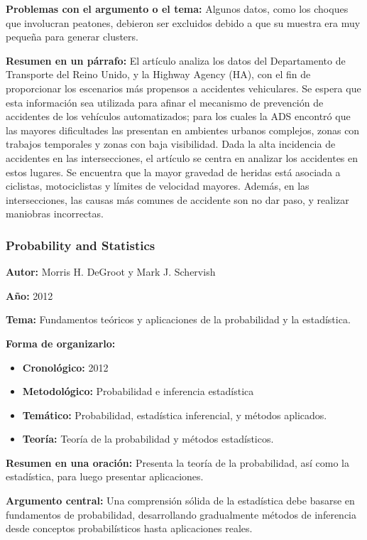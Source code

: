 \documentclass{book}
\begin{document}
\textbf{Problemas con el argumento o el tema:} Algunos datos, como los choques que involucran peatones, debieron ser excluidos debido a que su muestra era muy pequeña para generar clusters.

\textbf{Resumen en un párrafo:} El artículo analiza los datos del Departamento de Transporte del Reino Unido, y la Highway Agency (HA), con el fin de proporcionar los escenarios más propensos a accidentes vehiculares. Se espera que esta información sea utilizada para afinar el mecanismo de prevención de accidentes de los vehículos automatizados; para los cuales la ADS encontró que las mayores dificultades las presentan en ambientes urbanos complejos, zonas con trabajos temporales y zonas con baja visibilidad. Dada la alta incidencia de accidentes en las intersecciones, el artículo se centra en analizar los accidentes en estos lugares.  Se encuentra que la mayor gravedad de heridas está asociada a ciclistas, motociclistas y límites de velocidad mayores. Además, en las intersecciones, las causas más comunes de accidente son no dar paso, y realizar maniobras incorrectas. 

\subsubsection{Probability and Statistics}
\textbf{Autor:} Morris H. DeGroot y Mark J. Schervish

\textbf{Año:} 2012

\textbf{Tema:} Fundamentos teóricos y aplicaciones de la probabilidad y la estadística.


\textbf{Forma de organizarlo:}

\begin{itemize}
\setlength{\itemindent}{0.5in}
    \item \textbf{Cronológico:} 2012
    \item \textbf{Metodológico:} Probabilidad e inferencia estadística
    \item \textbf{Temático:} Probabilidad, estadística inferencial, y métodos aplicados.
    \item \textbf{Teoría:} Teoría de la probabilidad y métodos estadísticos.
\end{itemize}

\textbf{Resumen en una oración:} Presenta la teoría de la probabilidad, así como la estadística, para luego presentar aplicaciones.

\textbf{Argumento central:} Una comprensión sólida de la estadística debe basarse en fundamentos de probabilidad, desarrollando gradualmente métodos de inferencia desde conceptos probabilísticos hasta aplicaciones reales.
\end{document}
